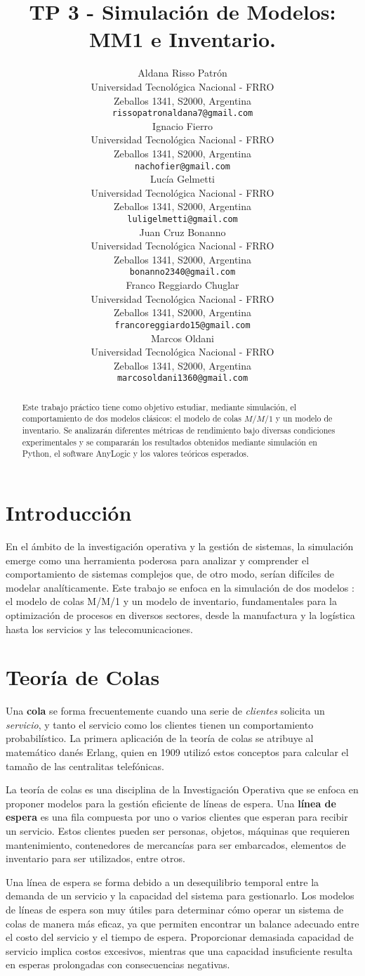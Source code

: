 \documentclass{article}
\title{TP 3 - Simulación de Modelos: MM1 e Inventario.}
\author{
 Aldana Risso Patrón \\
  Universidad Tecnológica Nacional - FRRO \\
  Zeballos 1341, S2000, Argentina \\
  \texttt{rissopatronaldana7@gmail.com} \\
   \And
 Ignacio Fierro \\
  Universidad Tecnológica Nacional - FRRO \\
  Zeballos 1341, S2000, Argentina \\
  \texttt{nachofier@gmail.com} \\
  \And
 Lucía Gelmetti \\
  Universidad Tecnológica Nacional - FRRO \\
  Zeballos 1341, S2000, Argentina \\
  \texttt{luligelmetti@gmail.com} \\
  \And
 Juan Cruz Bonanno \\
  Universidad Tecnológica Nacional - FRRO \\
  Zeballos 1341, S2000, Argentina \\
  \texttt{bonanno2340@gmail.com} \\
  \And
 Franco Reggiardo Chuglar \\
  Universidad Tecnológica Nacional - FRRO\\
  Zeballos 1341, S2000, Argentina \\
  \texttt{francoreggiardo15@gmail.com} \\
  \And
 Marcos Oldani \\
  Universidad Tecnológica Nacional - FRRO \\
  Zeballos 1341, S2000, Argentina \\
  \texttt{marcosoldani1360@gmail.com} \\
}
\begin{document}
\maketitle
\begin{abstract}
Este trabajo práctico tiene como objetivo estudiar, mediante simulación, el comportamiento de dos modelos clásicos: el modelo de colas \( M/M/1 \) y un modelo de inventario. Se analizarán diferentes métricas de rendimiento bajo diversas condiciones experimentales y se compararán los resultados obtenidos mediante simulación en Python, el software AnyLogic y los valores teóricos esperados.
\end{abstract}

\section{Introducción}
En el ámbito de la investigación operativa y la gestión de sistemas, la simulación emerge como una herramienta poderosa para analizar y comprender el comportamiento de sistemas complejos que, de otro modo, serían difíciles de modelar analíticamente. Este trabajo se enfoca en la simulación de dos modelos : el modelo de colas M/M/1 y un modelo de inventario, fundamentales para la optimización de procesos en diversos sectores, desde la manufactura y la logística hasta los servicios y las telecomunicaciones.

\section{Teoría de Colas}
Una \textbf{cola} se forma frecuentemente cuando una serie de \textit{clientes} solicita un \textit{servicio}, y tanto el servicio como los clientes tienen un comportamiento probabilístico. La primera aplicación de la teoría de colas se atribuye al matemático danés Erlang, quien en 1909 utilizó estos conceptos para calcular el tamaño de las centralitas telefónicas.

La teoría de colas es una disciplina de la Investigación Operativa que se enfoca en proponer modelos para la gestión eficiente de líneas de espera. Una \textbf{línea de espera} es una fila compuesta por uno o varios clientes que esperan para recibir un servicio. Estos clientes pueden ser personas, objetos, máquinas que requieren mantenimiento, contenedores de mercancías para ser embarcados, elementos de inventario para ser utilizados, entre otros.

Una línea de espera se forma debido a un desequilibrio temporal entre la demanda de un servicio y la capacidad del sistema para gestionarlo. Los modelos de líneas de espera son muy útiles para determinar cómo operar un sistema de colas de manera más eficaz, ya que permiten encontrar un balance adecuado entre el costo del servicio y el tiempo de espera. Proporcionar demasiada capacidad de servicio implica costos excesivos, mientras que una capacidad insuficiente resulta en esperas prolongadas con consecuencias negativas.
\end{document}
